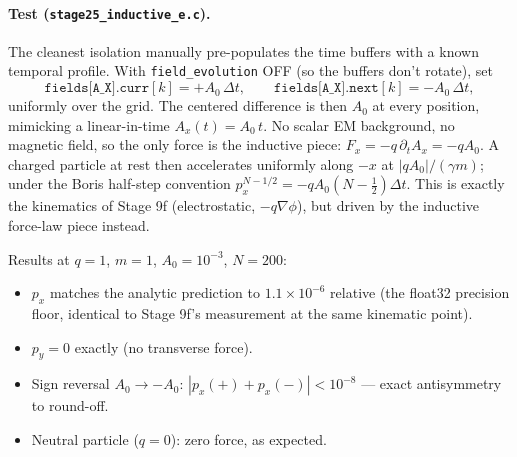 \documentclass[11pt,a4paper]{article}
\begin{document}
\paragraph{Test (\texttt{stage25\_inductive\_e.c}).}  The cleanest
isolation manually pre-populates the time buffers with a known temporal
profile.  With \texttt{field\_evolution} OFF (so the buffers don't
rotate), set
\[
  \texttt{fields[A\_X].curr}[k] = +A_0\,\Delta t,\qquad
  \texttt{fields[A\_X].next}[k] = -A_0\,\Delta t,
\]
uniformly over the grid.  The centered difference is then $A_0$ at every
position, mimicking a linear-in-time $A_x(t) = A_0\,t$.  No scalar EM
background, no magnetic field, so the only force is the inductive piece:
$F_x = -q\,\partial_t A_x = -q A_0$.  A charged particle at rest then
accelerates uniformly along $-x$ at $|q A_0|/(\gamma m)$; under the
Boris half-step convention $p_x^{N-1/2} = -q A_0 (N-\tfrac{1}{2})\Delta t$.
This is exactly the kinematics of Stage 9f (electrostatic, $-q\nabla\phi$),
but driven by the inductive force-law piece instead.

Results at $q=1$, $m=1$, $A_0 = 10^{-3}$, $N = 200$:
\begin{itemize}
  \item $p_x$ matches the analytic prediction to $1.1\times 10^{-6}$
    relative (the float32 precision floor, identical to Stage 9f's
    measurement at the same kinematic point).
  \item $p_y = 0$ exactly (no transverse force).
  \item Sign reversal $A_0 \to -A_0$: $|p_x(+) + p_x(-)| < 10^{-8}$ ---
    exact antisymmetry to round-off.
  \item Neutral particle ($q = 0$): zero force, as expected.
\end{itemize}
\end{document}
